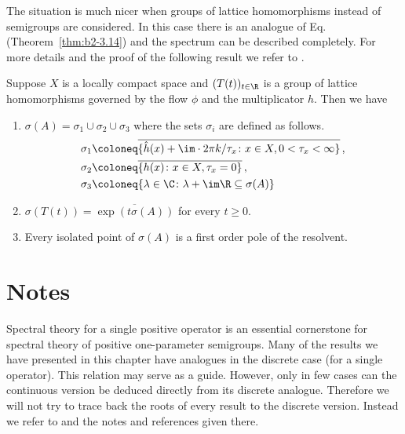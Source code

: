 The situation is much nicer when groups of lattice homomorphisms instead of semigroups are considered.
In this case there is an analogue of Eq.~ (\cf Theorem~\ref{thm:b2-3.14}) and the spectrum can be described completely.
For more details and the proof of the following result we refer to \textcite{arendtgreiner:1984}.
\begin{theorem}\label{thm:b3-4.11}
	Suppose $X$ is a locally compact space and $(T(t))_{t\in\R}$ is a group of lattice homomorphisms
    governed by the flow $\phi$ and the multiplicator $h$.
	Then we have
	\begin{enumerate}[\upshape (i)]
		\item 
		$\sigma(A) = \sigma_{1}\cup\sigma_{2}\cup\sigma_{3}$ where the sets $\sigma_{i}$ are defined as follows.
		\[\begin{aligned}
			\sigma_{1} &\coloneq \overline{\{\hat{h}(x) + \im\cdot 2\pi k/\tau_{x} \colon x \in X, 0 < \tau_{x} < \infty\}}\,,\\
			\sigma_{2} &\coloneq \overline{\{h(x) \colon x \in X, \tau_{x} = 0\}}\,, \\
			\sigma_{3} &\coloneq \{\lambda \in \C \colon \lambda + \im\R \subseteq \sigma(A)\}
		\end{aligned}\]
		
		\item 
		$\sigma(T(t)) = \overline{\exp(t\sigma(A))}$ for every $t \geq 0$.
		
		\item 
		Every isolated point of\/ $\sigma(A)$ is a first order pole of the resolvent.
	\end{enumerate}
\end{theorem}
\section*{Notes}
Spectral theory for a single positive operator is an essential cornerstone for spectral theory of positive one-parameter semigroups.
Many of the results we have presented in this chapter have analogues in the discrete case (\ie for a single operator).
This relation may serve as a guide.
However, only in few cases can the continuous version be deduced directly from its discrete analogue.
Therefore we will not try to trace back the roots of every result to the discrete version.
Instead we refer to \textcite{schaefer:1974} and the notes and references given there.

